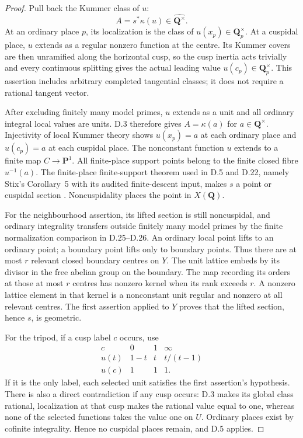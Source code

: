 \begin{proof}
Pull back the Kummer class of $u$:
\[
                A=s^\ast\kappa(u)
                   \in\widehat{\mathbf Q^\times}.
\]
At an ordinary place $p$, its localization is the class
of $u(x_p)\in\mathbf Q_p^\times$.
At a cuspidal place, $u$ extends as a regular nonzero
function at the centre. Its Kummer covers are then
unramified along the horizontal cusp, so the cusp inertia
acts trivially and every continuous splitting gives the
actual leading value $u(c_p)\in\mathbf Q_p^\times$.
This assertion includes arbitrary completed tangential
classes; it does not require a rational tangent vector.

After excluding finitely many model primes, $u$ extends
as a unit and all ordinary integral local values are
units. D.3 therefore gives $A=\kappa(a)$ for
$a\in\mathbf Q^\times$.
Injectivity of local Kummer theory shows
$u(x_p)=a$ at each ordinary place and $u(c_p)=a$
at each cuspidal place.
The nonconstant function $u$ extends to a finite map
$C\to\mathbf P^1$. All finite-place support points
belong to the finite closed fibre $u^{-1}(a)$.
The finite-place finite-support theorem used in D.5 and
D.22, namely Stix's Corollary~5 with its audited
finite-descent input, makes $s$ a point or cuspidal
section \citep{D_Stix2015}. Noncuspidality places the
point in $X(\mathbf Q)$.

For the neighbourhood assertion, its lifted section is
still noncuspidal, and ordinary integrality transfers
outside finitely many model primes by the finite
normalization comparison in D.25--D.26.
An ordinary local point lifts to an ordinary point;
a boundary point lifts only to boundary points.
Thus there are at most $r$ relevant closed boundary
centres on $Y$.
The unit lattice embeds by its divisor in the free
abelian group on the boundary. The map recording its
orders at those at most $r$ centres has nonzero kernel
when its rank exceeds $r$. A nonzero lattice element
in that kernel is a nonconstant unit regular and
nonzero at all relevant centres. The first assertion
applied to $Y$ proves that the lifted section, hence
$s$, is geometric.

For the tripod, if a cusp label $c$ occurs, use
\[
\begin{array}{c|ccc}
c&0&1&\infty\\ \hline
u(t)&1-t&t&t/(t-1)\\
u(c)&1&1&1 .
\end{array}
\]
If it is the only label, each selected unit satisfies
the first assertion's hypothesis. There is also a
direct contradiction if any cusp occurs: D.3 makes
its global class rational, localization at that cusp
makes the rational value equal to one, whereas none
of the selected functions takes the value one on $U$.
Ordinary places exist by cofinite integrality.
Hence no cuspidal places remain, and D.5 applies.
\end{proof}

